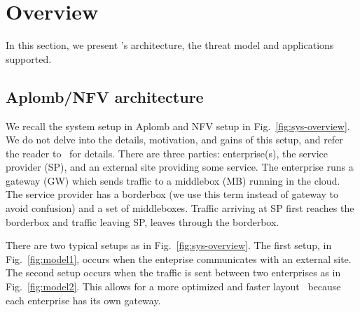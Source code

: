 


     
\section{Overview}\label{sec:overview}



In this section, we present \sys's architecture, the threat model and applications supported.


\subsection{Aplomb/NFV architecture}

We recall the system setup in Aplomb and NFV setup  in Fig.~\ref{fig:sys-overview}.
We do not delve into the details, motivation, and gains of this setup, and refer the reader to~\cite{aplomb} for details. 
There are three parties: enterprise(s), the service provider (SP), and an external site providing
some service. The enterprise runs a gateway (GW) which sends traffic to a middlebox (MB) running in the cloud.
The service provider has a borderbox (we use this term instead of gateway to avoid
confusion) and a set of middleboxes. Traffic arriving at SP first reaches the borderbox and traffic leaving SP, leaves through the borderbox.  

There are two typical setups as in Fig.~\ref{fig:sys-overview}.  The first setup, in Fig.~\ref{fig:model1},  occurs when the enteprise communicates with an external site. The second setup occurs when the traffic is sent between two enterprises as in Fig.~\ref{fig:model2}. This allows for a more optimized and faster layout~\cite{aplomb} because  each enterprise has its own gateway.










